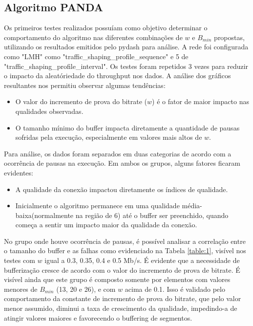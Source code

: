 \documentclass[10pt,twocolumn,letterpaper]{article}
\begin{document}
	\subsection{Algoritmo PANDA}
	Os primeiros testes realizados possuíam como objetivo determinar o comportamento do algoritmo nas diferentes combinações de $w$ e $B_{min}$ propostas, utilizando os resultados emitidos pelo pydash para análise. A rede foi configurada como "LMH" como "traffic\_shaping\_profile\_sequence" e 5 de "traffic\_shaping\_profile\_interval". Os testes foram repetidos 3 vezes para reduzir o impacto da aleatóriedade do throughput nos dados. A análise dos gráficos resultantes nos permitiu observar algumas tendências: 
	\begin{itemize}
		\item O valor do incremento de prova do bitrate ($w$) é o fator de maior impacto nas qualidades observadas. 
		\item O tamanho mínimo do buffer impacta diretamente a quantidade de pausas sofridas pela execução, especialmente em valores mais altos de $w$.
	\end{itemize}
	Para análise, os dados foram separados em duas categorias de acordo com a ocorrência de pausas na execução. Em ambos os grupos, alguns fatores ficaram evidentes:
	\begin{itemize}
		\item A qualidade da conexão impactou diretamente os índices de qualidade.
		\item Inicialmente o algoritmo permanece em uma qualidade média-baixa(normalmente na região de 6) até o buffer ser preenchido, quando começa a sentir um impacto maior da qualidade da conexão.
	\end{itemize}
	
	No grupo onde houve ocorrência de pausas, é possível analisar a correlação entre o tamanho do buffer e as falhas como evidenciado na Tabela \ref{table:1}, visível nos testes com $w$ igual a 0.3, 0.35, 0.4 e  0.5 Mb/s. É evidente que a necessidade de bufferização cresce de acordo com o valor do incremento de prova de bitrate. É visível ainda que este grupo é composto somente por elementos com valores menores de $B_{min}$ (13, 20 e 26), e com $w$ acima de 0.1. Isso é validado pelo comportamento da  
	constante de incremento de prova do bitrate, que pelo valor menor assumido, diminui a taxa de crescimento da qualidade, impedindo-a de atingir valores maiores e favorecendo o buffering de segmentos.
	
\end{document}
